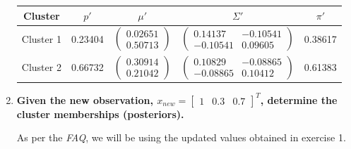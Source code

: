\documentclass[12pt]{article}
\begin{document}
\begin{enumerate}[leftmargin=\labelsep]
          \begin{center}
              \captionsetup{type=table}
              \begin{tabular}{c|cccc}
                  Cluster & $p'$ & $\mu'$ & $\Sigma'$ & $\pi'$                              \\
                  \hline
                  \colorbox{bmint}{Cluster 1}                                               &
                  0.23404                                                                   &
                  $\begin{pmatrix} 0.02651 \\ 0.50713 \end{pmatrix}$                        &
                  $\begin{pmatrix} 0.14137 & -0.10541 \\ -0.10541 & 0.09605 \end{pmatrix}$  &
                  0.38617                                                                   \\
                  \colorbox{byellow}{Cluster 2}                                             &
                  0.66732                                                                   &
                  $\begin{pmatrix} 0.30914 \\ 0.21042 \end{pmatrix}$                        &
                  $\begin{pmatrix} 0.10829 & -0.08865 \\ -0.08865 & 0.10412 \end{pmatrix}$  &
                  0.61383                                                                   \\
              \end{tabular}
              \label{exI1-updated-params-table}
          \end{center}

    \item \textbf{Given the new observation, $x_{new} = \begin{bmatrix} 1 & 0.3 & 0.7 \end{bmatrix}^T$, determine the cluster memberships (posteriors).}

          \vskip 0.3cm
          As per the \textit{FAQ}, we will be using the updated values obtained in exercise 1.


\end{enumerate}
\end{document}
